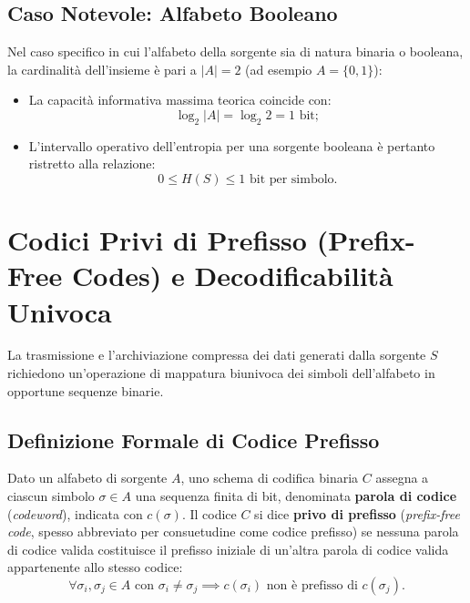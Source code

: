 \FloatBarrier
\subsection{Caso Notevole: Alfabeto Booleano}
\label{subsec:alfabeto-booleano}

Nel caso specifico in cui l'alfabeto della sorgente sia di natura binaria o booleana, la cardinalit\`a dell'insieme \`e pari a $|A| = 2$ (ad esempio $A = \{0, 1\}$):
\begin{itemize}
  \item La capacit\`a informativa massima teorica coincide con:
  \begin{equation}
    \log_2 |A| = \log_2 2 = 1 \text{ bit};
  \end{equation}
  \item L'intervallo operativo dell'entropia per una sorgente booleana \`e pertanto ristretto alla relazione:
  \begin{equation}
    0 \le H(S) \le 1 \text{ bit per simbolo}.
  \end{equation}
\end{itemize}

\FloatBarrier
\section{Codici Privi di Prefisso (Prefix-Free Codes) e Decodificabilit\`a Univoca}
\label{sec:codici-prefisso}

La trasmissione e l'archiviazione compressa dei dati generati dalla sorgente $S$ richiedono un'operazione di mappatura biunivoca dei simboli dell'alfabeto in opportune sequenze binarie.

\FloatBarrier
\subsection{Definizione Formale di Codice Prefisso}
\label{subsec:definizione-codice-prefisso}

\begin{definition}
Dato un alfabeto di sorgente $A$, uno schema di codifica binaria $C$ assegna a ciascun simbolo $\sigma \in A$ una sequenza finita di bit, denominata \textbf{parola di codice} (\textit{codeword}), indicata con $c(\sigma)$.
Il codice $C$ si dice \textbf{privo di prefisso} (\textit{prefix-free code}, spesso abbreviato per consuetudine come codice prefisso) se nessuna parola di codice valida costituisce il prefisso iniziale di un'altra parola di codice valida appartenente allo stesso codice:
\begin{equation}
  \forall \sigma_i, \sigma_j \in A \text{ con } \sigma_i \neq \sigma_j \implies c(\sigma_i) \text{ non \`e prefisso di } c(\sigma_j).
  \label{eq:prefix-property}
\end{equation}
\end{definition}

